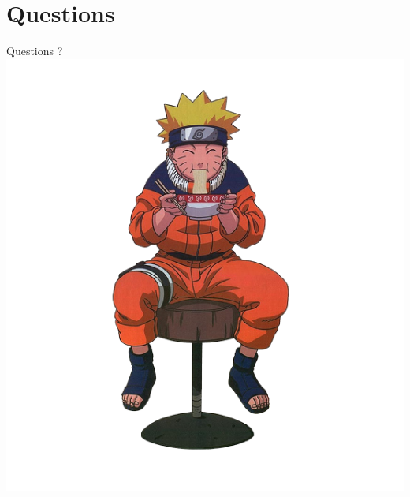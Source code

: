 \documentclass{beamer}
\begin{document}
\section{Questions}
\begin{frame}{Questions ?}
    \centering
    \includegraphics[width=0.7\linewidth]{img/naruto_ramen.png}
\end{frame}
\end{document}
